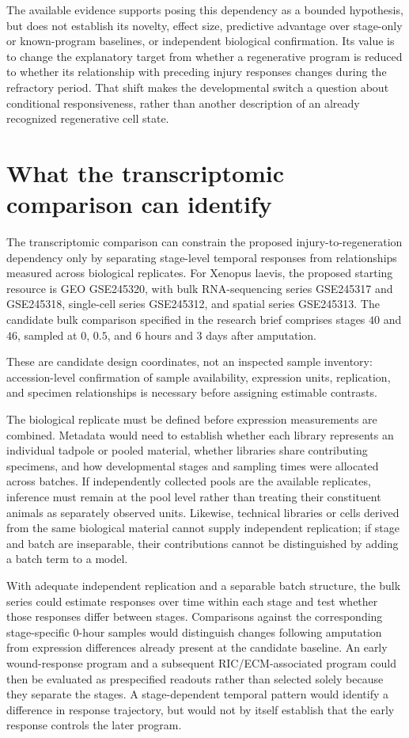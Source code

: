 \documentclass[11pt]{article}
\begin{document}
The available evidence supports posing this dependency as a bounded hypothesis, but does not establish its novelty, effect size, predictive advantage over stage-only or known-program baselines, or independent biological confirmation. Its value is to change the explanatory target from whether a regenerative program is reduced to whether its relationship with preceding injury responses changes during the refractory period. That shift makes the developmental switch a question about conditional responsiveness, rather than another description of an already recognized regenerative cell state.

\section{What the transcriptomic comparison can identify}
The transcriptomic comparison can constrain the proposed injury-to-regeneration dependency only by separating stage-level temporal responses from relationships measured across biological replicates. For Xenopus laevis, the proposed starting resource is GEO GSE245320, with bulk RNA-sequencing series GSE245317 and GSE245318, single-cell series GSE245312, and spatial series GSE245313. The candidate bulk comparison specified in the research brief comprises stages $40$ and $46$, sampled at $0$, $0.5$, and $6$ hours and $3$ days after amputation.

These are candidate design coordinates, not an inspected sample inventory: accession-level confirmation of sample availability, expression units, replication, and specimen relationships is necessary before assigning estimable contrasts.

The biological replicate must be defined before expression measurements are combined. Metadata would need to establish whether each library represents an individual tadpole or pooled material, whether libraries share contributing specimens, and how developmental stages and sampling times were allocated across batches. If independently collected pools are the available replicates, inference must remain at the pool level rather than treating their constituent animals as separately observed units. Likewise, technical libraries or cells derived from the same biological material cannot supply independent replication; if stage and batch are inseparable, their contributions cannot be distinguished by adding a batch term to a model.

With adequate independent replication and a separable batch structure, the bulk series could estimate responses over time within each stage and test whether those responses differ between stages. Comparisons against the corresponding stage-specific $0$-hour samples would distinguish changes following amputation from expression differences already present at the candidate baseline. An early wound-response program and a subsequent RIC/ECM-associated program could then be evaluated as prespecified readouts rather than selected solely because they separate the stages. A stage-dependent temporal pattern would identify a difference in response trajectory, but would not by itself establish that the early response controls the later program.
\end{document}
